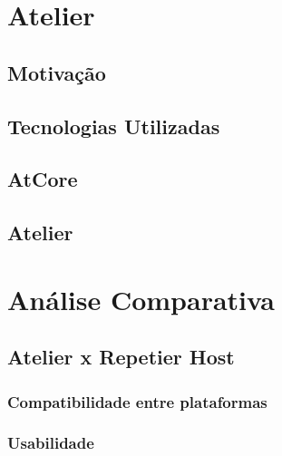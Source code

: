\section{Atelier}
\subsection{Motivação}
\subsection{Tecnologias Utilizadas}
\subsection{AtCore}
\subsection{Atelier}

\section{Análise Comparativa}
\subsection{Atelier x Repetier Host}
\subsubsection{Compatibilidade entre plataformas}
\subsubsection{Usabilidade}

